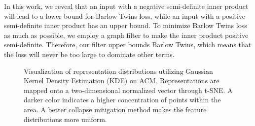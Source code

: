 \documentclass[letterpaper]{article} %
\begin{document}
In this work, we reveal that an input with a negative semi-definite inner product will lead to a lower bound for Barlow Twins loss, while an input with a positive semi-definite inner product has an upper bound. To minimize Barlow Twins loss as much as possible, we employ a graph filter to make the inner product positive semi-definite. Therefore, our filter upper bounds Barlow Twins, which means that the loss will never be too large to dominate other terms. 

\begin{figure}[htb]
\centering
{}
\caption{Visualization of representation distributions utilizing Gaussian Kernel Density Estimation (KDE) \cite{botev2010kernel} on ACM. Representations are mapped onto a two-dimensional normalized vector through t-SNE. A darker color indicates a higher concentration of points within the area. %
A better collapse mitigation method makes the feature distributions more uniform.}
\label{collapse}
\end{figure}
\end{document}
